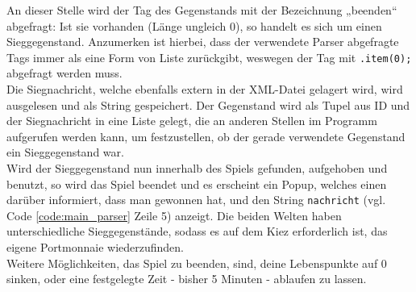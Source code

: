 \documentclass[12pt,twoside]{article}
\theoremstyle{plain}
\theoremstyle{definition}
\theoremstyle{remark}
\begin{document}
An dieser Stelle wird der Tag des Gegenstands mit der Bezeichnung „beenden“ abgefragt: Ist sie vorhanden (Länge ungleich 0), so handelt es sich um einen Sieggegenstand.
Anzumerken ist hierbei, dass der verwendete Parser abgefragte Tags immer als eine Form von Liste zurückgibt, weswegen der Tag mit \texttt{.item(0);} abgefragt werden muss.\\
Die Siegnachricht, welche ebenfalls extern in der XML-Datei gelagert wird, wird ausgelesen und als String gespeichert.
Der Gegenstand wird als Tupel aus ID und der Siegnachricht in eine Liste gelegt, die an anderen Stellen im Programm aufgerufen werden kann, um festzustellen, ob der gerade verwendete Gegenstand ein Sieggegenstand war.\\
Wird der Sieggegenstand nun innerhalb des Spiels gefunden, aufgehoben und benutzt, so wird das Spiel beendet und es erscheint ein Popup, welches einen darüber informiert, dass man gewonnen hat, und den String \texttt{nachricht} (vgl. Code \ref{code:main_parser} Zeile 5) anzeigt.
Die beiden Welten haben unterschiedliche Sieggegenstände, sodass es auf dem Kiez erforderlich ist, das eigene Portmonnaie wiederzufinden.
\\
Weitere Möglichkeiten, das Spiel zu beenden, sind, deine Lebenspunkte auf 0 sinken, oder eine festgelegte Zeit - bisher 5 Minuten - ablaufen zu lassen.

%
%
\end{document}
